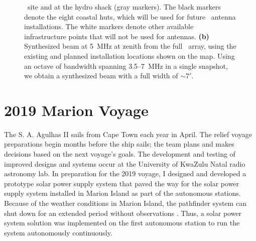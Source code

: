 \begin{figure}
{		\prizm\ site and at the hydro shack (gray markers).  The black
		markers denote the eight coastal huts, which will be used for
		future \albatros\ antenna installations.  The white markers
		denote other available infrastructure points that will not be
		used for antennas. {\bf (b)} Synthesized beam at 5~MHz at zenith from the full \albatros\ array, using the existing and planned
		installation locations shown on the map.  Using an octave of
		bandwidth spanning 3.5--7~MHz in a single snapshot, we obtain a synthesized beam with a full width of $\sim7'$. }\label{Fig:marion_map_beam}
\end{figure}

\section{2019 Marion Voyage}


The S. A. Agulhas II sails from Cape Town each year in April. The relief voyage preparations begin months before the ship sails; the team plans and makes decisions based on the next voyage's goals. The development and testing of improved designs and systems occur at the University of KwaZulu Natal radio astronomy lab. In preparation for the 2019 voyage, I designed and developed a prototype solar power supply system that paved the way for the solar power supply system installed in Marion Island as part of the autonomous stations.  Because of the weather conditions in Marion Island, the pathfinder system can shut down for an extended period without observations . Thus, a solar power system solution was implemented on the first autonomous station to run the system autonomously continuously. 

